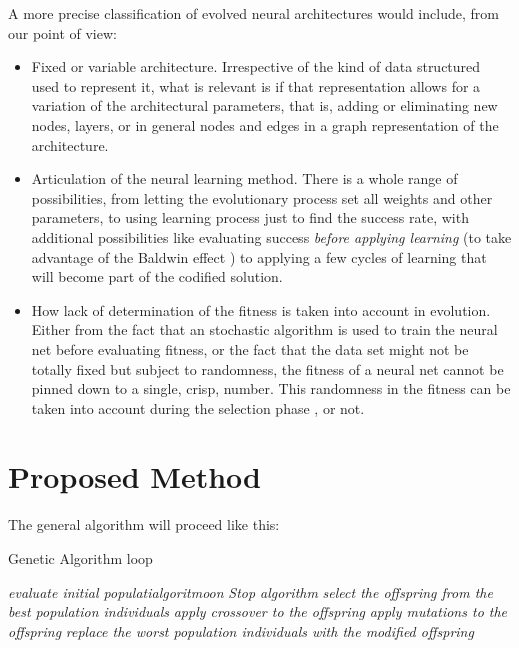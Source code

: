 \documentclass[runningheads]{llncs}
\begin{document}
A more precise classification of evolved neural architectures would include, from our point of
view: \begin{itemize}
  \item Fixed or variable architecture. Irrespective of the kind of
    data structured used to represent it, what is relevant is if that
    representation allows for a variation of the architectural
    parameters, that is, adding or eliminating new nodes, layers, or
    in general nodes and edges in a graph representation of the
    architecture.
  \item Articulation of the neural learning method. There is a whole
    range of possibilities, from letting the evolutionary process set
    all weights and other parameters, to using learning process just
    to find the success rate, with additional possibilities like
    evaluating success {\em before applying learning} (to take
    advantage of the Baldwin effect \cite{castillo-2006}) to applying
    a few cycles of learning that will become part of the codified
    solution.
  \item How lack of determination of the fitness is taken into account
    in evolution. Either from the fact that an stochastic algorithm is
    used to train the neural net before evaluating fitness, or the
    fact that the data set might not be totally fixed but subject to
    randomness, the fitness of a neural net cannot be pinned down to a
    single, crisp, number. This randomness in the fitness can be taken
    into account during the selection phase
    \cite{DBLP:conf/ijcci/MereloLFGCCRMG15}, or not.


\end{itemize}

\section{Proposed Method}
\label{method}

The general algorithm will proceed like this:

\begin{algorithm}
  \caption{Genetic Algorithm loop}\label{alg:ga}
  \begin{algorithmic}[1]
    \State \textit{evaluate initial populatialgoritmoon}
    \State \textit{Stop algorithm}
    \EndIf
    \State \textit{select the offspring from the best population individuals}
    \State \textit{apply crossover to the offspring}
    \State \textit{apply mutations to the offspring}
    \State \textit{replace the worst population individuals with the modified offspring}
    \EndWhile
  \end{algorithmic}
\end{algorithm}
\end{document}

